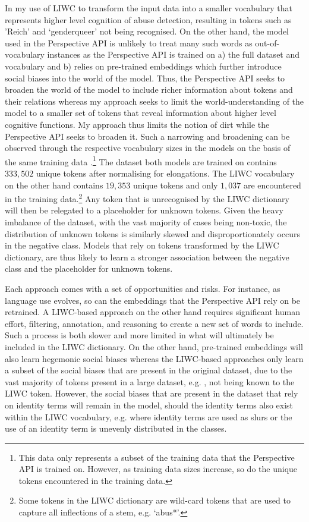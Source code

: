 In my use of LIWC to transform the input data into a smaller vocabulary that represents higher level cognition of abuse detection, resulting in tokens such as 'Reich' and `genderqueer' not being recognised. On the other hand, the model used in the Perspective API is unlikely to treat many such words as out-of-vocabulary instances as the Perspective API is trained on a) the full dataset and vocabulary and b) relies on pre-trained embeddings which further introduce social biases into the world of the model. Thus, the Perspective API seeks to broaden the world of the model to include richer information about tokens and their relations whereas my approach seeks to limit the world-understanding of the model to a smaller set of tokens that reveal information about higher level cognitive functions. My approach thus limits the notion of dirt while the Perspective API seeks to broaden it. Such a narrowing and broadening can be observed through the respective vocabulary sizes in the models on the basis of the same training data \citep{Wulczyn:2017}.\footnote{This data only represents a subset of the training data that the Perspective API is trained on. However, as training data sizes increase, so do the unique tokens encountered in the training data.} The dataset both models are trained on contains $333,502$ unique tokens after normalising for elongations. The LIWC vocabulary on the other hand contains $19,353$ unique tokens and only $1,037$ are encountered in the training data.\footnote{Some tokens in the LIWC dictionary are wild-card tokens that are used to capture all inflections of a stem, e.g. `abus*'.} Any token that is unrecognised by the LIWC dictionary will then be relegated to a placeholder for unknown tokens.
Given the heavy imbalance of the dataset, with the vast majority of cases being non-toxic, the distribution of unknown tokens is similarly skewed and disproportionately occurs in the negative class. Models that rely on tokens transformed by the LIWC dictionary, are thus likely to learn a stronger association between the negative class and the placeholder for unknown tokens.

Each approach comes with a set of opportunities and risks. For instance, as language use evolves, so can the embeddings that the Perspective API rely on be retrained. A LIWC-based approach on the other hand requires significant human effort, filtering, annotation, and reasoning to create a new set of words to include. Such a process is both slower and more limited in what will ultimately be included in the LIWC dictionary. On the other hand, pre-trained embeddings will also learn hegemonic social biases \citep{Bender:2021} whereas the LIWC-based approaches only learn a subset of the social biases that are present in the original dataset, due to the vast majority of tokens present in a large dataset, e.g. \citep{Wulczyn:2017}, not being known to the LIWC token. However, the social biases that are present in the dataset that rely on identity terms will remain in the model, should the identity terms also exist within the LIWC vocabulary, e.g. where identity terms are used as slurs or the use of an identity term is unevenly distributed in the classes.

